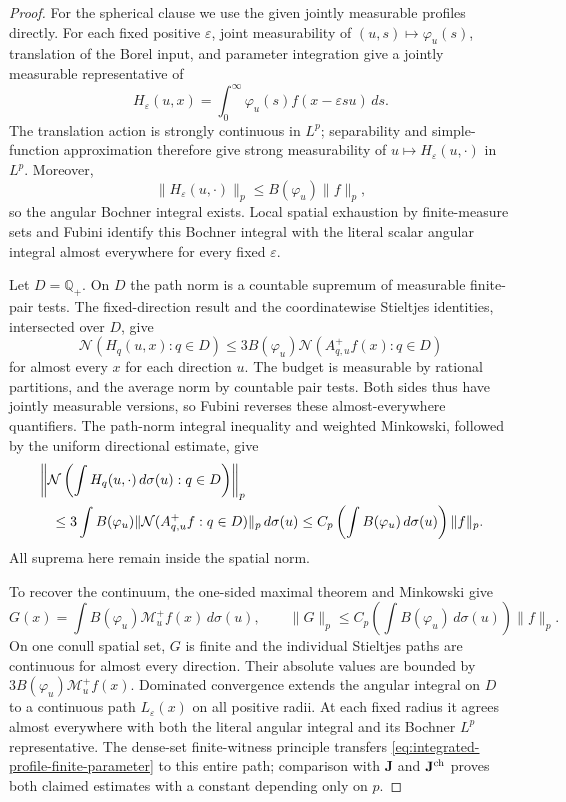 \documentclass[11pt]{article}
\numberwithin{equation}{section}
\theoremstyle{remark}
\theoremstyle{definition}
\newcommand{\NN}{\mathcal N}
\begin{document}
\begin{proof}
For the spherical clause we use the given jointly measurable
profiles directly.
For each fixed positive $\varepsilon$, joint measurability of
$(u,s)\mapsto\varphi_u(s)$, translation of the Borel input, and
parameter integration give a jointly measurable representative of
\[
 H_\varepsilon(u,x)
   =\int_0^\infty\varphi_u(s)f(x-\varepsilon su)\,ds.
\]
The translation action is strongly continuous in $L^p$; separability
and simple-function approximation therefore give strong measurability
of $u\mapsto H_\varepsilon(u,\cdot)$ in $L^p$.  Moreover,
\[
 \|H_\varepsilon(u,\cdot)\|_p
 \le B(\varphi_u)\|f\|_p,
\]
so the angular Bochner integral exists.  Local spatial exhaustion by
finite-measure sets and Fubini identify this Bochner integral with
the literal scalar angular integral almost everywhere for every fixed
$\varepsilon$.

Let $D=\mathbb Q_+$.  On $D$ the path norm is a countable supremum of
measurable finite-pair tests.  The fixed-direction result and the
coordinatewise Stieltjes identities, intersected over $D$, give
\[
 \NN(H_q(u,x):q\in D)
 \le3B(\varphi_u)\NN(A^+_{q,u}f(x):q\in D)
\]
for almost every $x$ for each direction $u$.  The budget is measurable by rational partitions, and the average norm
by countable pair tests.  Both sides thus have jointly measurable
versions, so Fubini reverses these almost-everywhere quantifiers.  The path-norm integral inequality and weighted
Minkowski, followed by the uniform directional estimate, give
\begin{align}\label{eq:integrated-profile-finite-parameter}
 &\left\|\NN\left(\int H_q(u,\cdot)\,d\sigma(u):q\in D\right)\right\|_p
 \notag\\
 &\quad\le3\int B(\varphi_u)
     \|\NN(A^+_{q,u}f:q\in D)\|_p\,d\sigma(u)
 \le C_p\left(\int B(\varphi_u)\,d\sigma(u)\right)\|f\|_p.
\end{align}
All suprema here remain inside the spatial norm.

To recover the continuum, the one-sided maximal theorem and Minkowski give
\[
 G(x)=\int B(\varphi_u)\mathcal M_u^+f(x)\,d\sigma(u),
 \qquad
 \|G\|_p\le C_p\left(\int B(\varphi_u)\,d\sigma(u)\right)\|f\|_p.
\]
On one conull spatial set, $G$ is finite and the individual Stieltjes
paths are continuous for almost every direction.  Their absolute
values are bounded by $3B(\varphi_u)\mathcal M_u^+f(x)$.
Dominated convergence extends the angular integral on $D$ to a
continuous path $L_\varepsilon(x)$ on all positive radii.  At each
fixed radius it agrees almost everywhere with both the literal
angular integral and its Bochner $L^p$ representative.  The dense-set
finite-witness principle transfers
\eqref{eq:integrated-profile-finite-parameter} to this entire path;
comparison with $\mathbf J$ and $\mathbf J^{\rm ch}$ proves both
claimed estimates with a constant depending only on $p$.


\end{proof}
\end{document}

